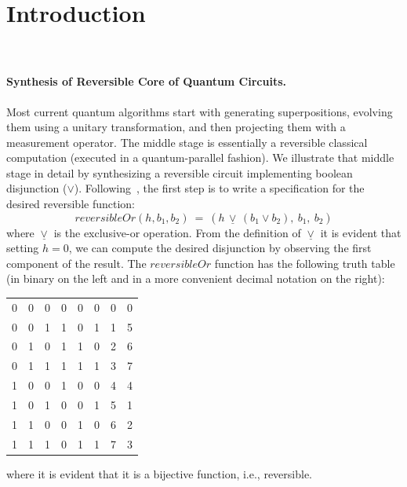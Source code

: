 \section{Introduction}~\label{sec:introduction}


\paragraph*{Synthesis of Reversible Core of Quantum Circuits.}

Most current quantum algorithms start with generating superpositions, evolving them using a unitary transformation, and then projecting them with a measurement operator. The middle stage is essentially a reversible classical computation (executed in a quantum-parallel fashion). We illustrate that middle stage in detail by synthesizing a reversible circuit implementing boolean disjunction ($\vee$). Following~\citet{Toffoli:1980}, the first step is to write a specification for the desired reversible function:
\[
\mathit{reversibleOr}(h,b_1,b_2) ~=~ (h \,\underline{\vee}\, (b_1 \vee b_2), ~b_1, ~b_2)
\]
where $\underline{\vee}$ is the exclusive-or operation. From the definition of $\underline{\vee}$ it is evident that setting $h=0$, we can compute the desired disjunction by observing the first component of the result. The $\mathit{reversibleOr}$ function has the following truth table (in binary on the left and in a more convenient decimal notation on the right):

\begin{center}\begin{tabular}{|ccc|ccc|@{\qquad\qquad}|c|c|}
0 & 0 & 0 &     0 & 0 & 0     & 0 & 0 \\
0 & 0 & 1 &     1 & 0 & 1     & 1 & 5 \\
0 & 1 & 0 &     1 & 1 & 0    & 2 & 6 \\
0 & 1 & 1 &     1 & 1 & 1    & 3 & 7 \\
1 & 0 & 0 &     1 & 0 & 0    & 4 & 4 \\
1 & 0 & 1 &     0 & 0 & 1    & 5 & 1 \\
1 & 1 & 0 &     0 & 1 & 0    & 6 & 2 \\
1 & 1 & 1 &     0 & 1 & 1    & 7 & 3
\end{tabular}\end{center}

\noindent where it is evident that it is a bijective function, i.e., reversible.

